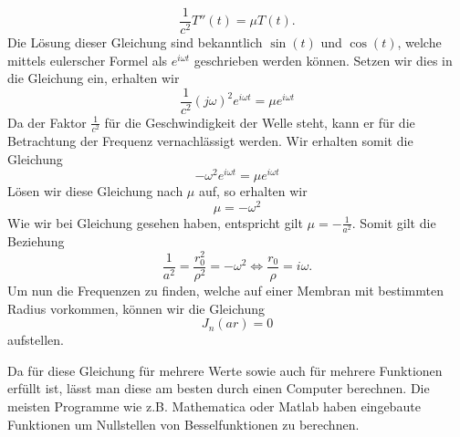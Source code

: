 \begin{equation}
\frac{1}{c^2} T''(t) = \mu T(t).
\end{equation} 
Die Lösung dieser Gleichung sind bekanntlich $\sin(t)$ und $\cos(t)$, welche mittels eulerscher Formel als $e^{i\omega t}$ geschrieben werden können.
Setzen wir dies in die Gleichung ein, erhalten wir
\begin{equation}
\frac{1}{c^2}(j\omega)^2 e^{i\omega t} = \mu e^{i\omega t}
\end{equation}
Da der Faktor $\frac{1}{c^2}$ für die Geschwindigkeit der Welle steht, kann er für die Betrachtung der Frequenz vernachlässigt werden. Wir erhalten somit die Gleichung
\begin{equation}
-\omega^2 e^{i\omega t} = \mu e^{i\omega t}
\end{equation}
Lösen wir diese Gleichung nach $\mu$ auf, so erhalten wir
\begin{equation}
\mu = -\omega^2
\end{equation}
Wie wir bei Gleichung  gesehen haben, entspricht gilt $\mu = -\frac{1}{a^2}$. Somit gilt die Beziehung
\begin{equation}
\frac{1}{a^2} = \frac{r_0^2}{\rho^2} = -\omega^2
\Leftrightarrow
\frac{r_0}{\rho} = i\omega.
\end{equation}
Um nun die Frequenzen zu finden, welche auf einer Membran mit bestimmten Radius vorkommen, können wir die Gleichung
\begin{equation}
J_n(ar) = 0
\end{equation}
aufstellen.

Da für diese Gleichung für mehrere Werte sowie auch für mehrere Funktionen erfüllt ist, lässt man diese am besten durch einen Computer berechnen. Die meisten Programme wie z.B. Mathematica oder Matlab haben eingebaute Funktionen um Nullstellen von Besselfunktionen zu berechnen.

